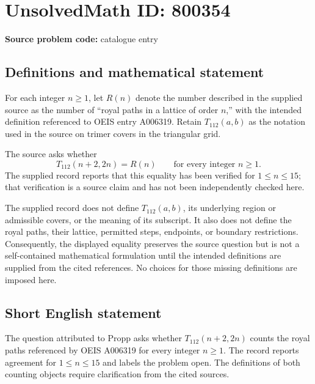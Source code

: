 \documentclass[11pt]{article}
\begin{document}
\section*{UnsolvedMath ID: 800354}
\textbf{Source problem code:} catalogue entry
\subsection{Definitions and mathematical statement}
For each integer \(n\geq 1\), let \(R(n)\) denote the number described in the supplied source as the number of ``royal paths in a lattice of order \(n\),'' with the intended definition referenced to OEIS entry A006319. Retain \(T_{112}(a,b)\) as the notation used in the source on trimer covers in the triangular grid.

The source asks whether
\[
T_{112}(n+2,2n)=R(n)\qquad\text{for every integer }n\geq 1.
\]
The supplied record reports that this equality has been verified for \(1\leq n\leq 15\); that verification is a source claim and has not been independently checked here.

The supplied record does not define \(T_{112}(a,b)\), its underlying region or admissible covers, or the meaning of its subscript. It also does not define the royal paths, their lattice, permitted steps, endpoints, or boundary restrictions. Consequently, the displayed equality preserves the source question but is not a self-contained mathematical formulation until the intended definitions are supplied from the cited references. No choices for those missing definitions are imposed here.
\subsection{Short English statement}
The question attributed to Propp asks whether \(T_{112}(n+2,2n)\) counts the royal paths referenced by OEIS A006319 for every integer \(n\geq 1\). The record reports agreement for \(1\leq n\leq 15\) and labels the problem open. The definitions of both counting objects require clarification from the cited sources.
\end{document}
